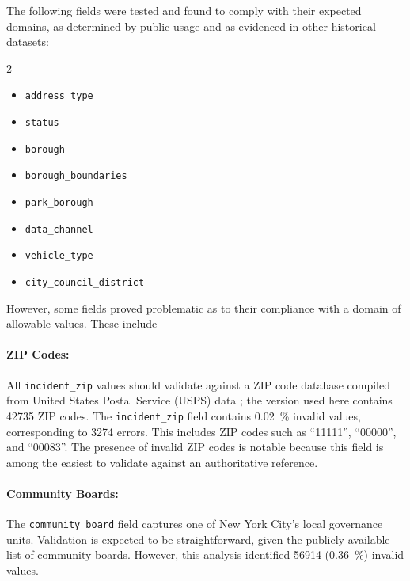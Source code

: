 \documentclass[linenumber]{jdsart}
\begin{document}
The following fields were tested and found to comply with their expected
domains, as determined by public usage and as evidenced in 
other historical datasets:

\begin{multicols}{2}
\begin{itemize}[left=1.5em, itemsep=0.1\baselineskip]
  \item \texttt{address\_type}
  \item \texttt{status}
  \item \texttt{borough}
  \item \texttt{borough\_boundaries}
  \item \texttt{park\_borough}
  \item \texttt{data\_channel}
  \item \texttt{vehicle\_type}
  \item \texttt{city\_council\_district}
\end{itemize}
\end{multicols}


However, some fields proved problematic as to their 
compliance with a domain of allowable values. These include

\paragraph{ZIP Codes:}
\label{sec:zipcodesissues}
All \texttt{incident\_zip} values should validate against a
ZIP code database compiled from United States Postal Service (USPS)
data \citep{zipcode_db}; the version used here contains
\num{42735} ZIP codes. The \texttt{incident\_zip} field
contains \SI[round-mode=places, round-precision=2]{0.02}{\percent}
invalid values, corresponding to \num{3274} errors.
 This includes ZIP codes such as ``11111'', ``00000'', and ``00083''. The presence of 
invalid ZIP codes is notable because this field is
among the easiest to validate against an authoritative reference.

\paragraph{Community Boards:}
\label{sec:communityboardissues}
The \texttt{community\_board} field captures one of New York City’s
local governance units. Validation is expected to be straightforward,
given the publicly available list of community boards. However,
this analysis identified \num{56914}
(\SI[round-mode=places, round-precision=2]{0.36}{\percent})
invalid values.
\end{document}
